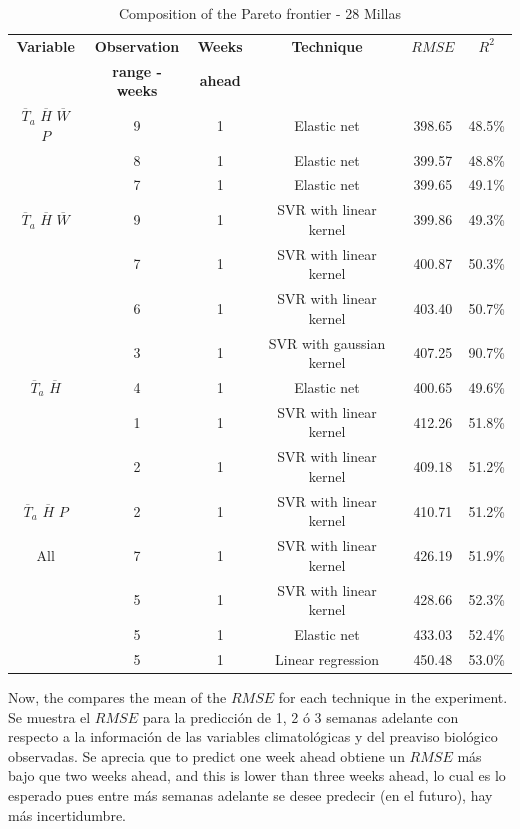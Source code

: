 \begin{table}[h] 
\caption{Composition of the Pareto frontier - 28 Millas} 
\label{tabla4} 
\centering
\begin{tabular}{c|c|c|c|c|c} 
\hline
\bfseries Variable & \bfseries Observation  & \bfseries Weeks & \bfseries Technique &\bfseries $RMSE$ & \bfseries $R^2$\\ 
                   & \bfseries range - weeks & \bfseries ahead   & & & \\
\hline\hline 
$\overline{T}_{a}$ $\overline{H}$ $\overline{W}$ $P$  &	9  & 1  & Elastic net & 398.65 & 48.5\% \\
													&	8  & 1 & Elastic net & 399.57 & 48.8\% \\
													&	7  & 1 & Elastic net & 399.65 & 49.1\% \\													
\hline 													
$\overline{T}_{a}$ $\overline{H}$ $\overline{W}$  &	9  & 1  & SVR with linear kernel & 399.86 & 49.3\% \\
												&	7  & 1  & SVR with linear kernel & 400.87 & 50.3\% \\
												&	6  & 1  & SVR with linear kernel & 403.40 & 50.7\% \\
												&	3  & 1  & SVR with gaussian kernel & 407.25 & 90.7\% \\													
\hline 													
$\overline{T}_{a}$ $\overline{H}$  &	4  & 1  & Elastic net & 400.65 & 49.6\% \\
									&	1  & 1  & SVR with linear kernel & 412.26 & 51.8\% \\
									&	2  & 1  & SVR with linear kernel & 409.18 & 51.2\% \\			
\hline 																												
$\overline{T}_{a}$ $\overline{H}$ $P$  & 2  & 1  & SVR with linear kernel & 410.71 & 51.2\% \\
\hline 																												
All  & 7  & 1  & SVR with linear kernel & 426.19 & 51.9\% \\
     & 5  & 1  & SVR with linear kernel & 428.66 & 52.3\% \\
     & 5 & 1  & Elastic net & 433.03 & 52.4\% \\
     &  5 & 1  & Linear regression & 450.48 & 53.0\% \\          
\hline	
\end{tabular} 
\end{table}
%
Now, the  compares the mean of the $RMSE$ for each technique in the experiment. Se muestra el $RMSE$ para la predicción de 1, 2 ó 3 semanas adelante con respecto a la información de las variables climatológicas y del preaviso biológico observadas. Se aprecia que to predict one week ahead obtiene un $RMSE$ más bajo que two weeks ahead, and this is lower than three weeks ahead, lo cual es lo esperado pues entre más semanas adelante se desee predecir (en el futuro), hay más incertidumbre.
